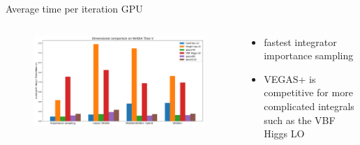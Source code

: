 \documentclass[t,handout,professionalfont,serif]{beamer}
\begin{document}
\begin{frame}{Average time per iteration GPU}
	
		\tiny
	\begin{columns}
		\begin{column}{0.7 \textwidth}
			\begin{figure}
				\includegraphics[width= \columnwidth]{gpu.png}
			\end{figure}
			
		\end{column}
			\hspace{-0.5cm}
		\begin{column}{0.3 \textwidth}
			\vspace{0.7cm}
			
			\begin{itemize}\setlength\itemsep{5em}
				
				\item fastest integrator importance sampling
				\item VEGAS+ is competitive for more complicated integrals such as the VBF Higgs LO
			\end{itemize}
		\end{column}
	\end{columns}


\end{frame}

	
\end{document}
